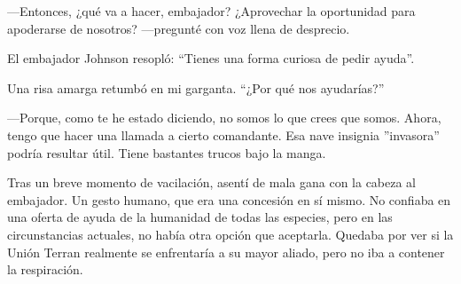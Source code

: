 —Entonces, ¿qué va a hacer, embajador? ¿Aprovechar la oportunidad para apoderarse de nosotros? —pregunté con voz llena de desprecio.

El embajador Johnson resopló: ``Tienes una forma curiosa de pedir ayuda''.

Una risa amarga retumbó en mi garganta. ``¿Por qué nos ayudarías?''

—Porque, como te he estado diciendo, no somos lo que crees que somos. Ahora, tengo que hacer una llamada a cierto comandante. Esa nave insignia ''invasora'' podría resultar útil. Tiene bastantes trucos bajo la manga.

Tras un breve momento de vacilación, asentí de mala gana con la cabeza al embajador. Un gesto humano, que era una concesión en sí mismo. No confiaba en una oferta de ayuda de la humanidad de todas las especies, pero en las circunstancias actuales, no había otra opción que aceptarla. Quedaba por ver si la Unión Terran realmente se enfrentaría a su mayor aliado, pero no iba a contener la respiración.